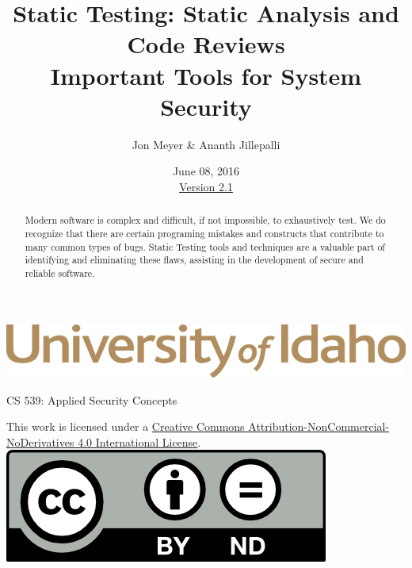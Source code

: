 \documentclass[12pt]{extarticle}
\begin{document}
\title{ Static Testing: Static Analysis and Code Reviews \\ \large Important Tools for System Security}
\author{Jon Meyer \& Ananth Jillepalli}
\date{June 08, 2016 \\ \hyperref[changelog]{Version 2.1}} %
\renewcommand{\abstractname}{Summary}
\begin{titlepage}
\maketitle
{}
\begin{center}
\includegraphics[scale=.5]{UofI}

\large{CS 539: Applied Security Concepts}

\vskip 40pt

\end{center}
\begin{abstract}
Modern software is complex and difficult, if not impossible, to exhaustively test.  We do recognize that there are certain programing mistakes and constructs that contribute to many common types of bugs.  Static Testing tools and techniques are a valuable part of identifying and eliminating these flaws, assisting in the development of secure and reliable software.
\end{abstract}


\vfill
\begin{center}
This work is licensed under a \href{http://creativecommons.org/licenses/by/4.0/}{Creative Commons Attribution-NonCommercial-NoDerivatives 4.0 International License}.
\vskip 10pt
\includegraphics[scale=.5]{cc}
\end{center}

\end{titlepage}


\pagebreak
\tableofcontents
\end{document}
